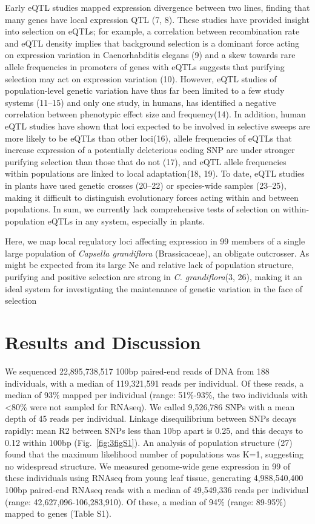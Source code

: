 Early eQTL studies mapped expression divergence between two lines, finding that many genes have local expression QTL (7, 8). These studies have provided insight into selection on eQTLs; for example,  a correlation between recombination rate and eQTL density implies that background selection is a dominant force acting on expression variation in Caenorhabditis elegans (9) and a skew towards rare allele frequencies in promoters of genes with eQTLs suggests that purifying selection may act on expression variation (10). However, eQTL studies of population-level genetic variation have thus far been limited to a few study systems (11–15) and only one study, in humans, has identified a negative correlation between phenotypic effect size and frequency(14). In addition, human eQTL studies have shown that loci expected to be involved in selective sweeps are more likely to be eQTLs than other loci(16), allele frequencies of eQTLs that increase expression of a potentially deleterious coding SNP are under stronger purifying selection than those that do not (17), and eQTL allele frequencies within populations are linked to local adaptation(18, 19). To date, eQTL studies in plants have used genetic crosses (20–22) or species-wide samples (23–25), making it difficult to distinguish evolutionary forces acting within and between populations. In sum, we currently lack comprehensive tests of selection on within-population eQTLs in any system, especially in plants.

Here, we map local regulatory loci affecting expression in 99 members of a single large population of \textit{Capsella grandiflora} (Brassicaceae), an obligate outcrosser. As might be expected from its large Ne and relative lack of population structure, purifying and positive selection are strong in \textit{C. grandiflora}(3, 26), making it an ideal system for investigating the maintenance of genetic variation in the face of selection 

\section{Results and Discussion}
We sequenced 22,895,738,517 100bp paired-end reads of DNA from 188 individuals, with a median of 119,321,591 reads per individual. Of these reads, a median of 93\% mapped per individual (range: 51\%-93\%, the two individuals with \textless 80\% were not sampled for RNAseq). We called 9,526,786 SNPs with a mean depth of 45 reads per individual. Linkage disequilibrium between SNPs decays rapidly: mean R2 between SNPs less than 10bp apart is 0.25, and this decays to 0.12 within 100bp (Fig.~\ref{fig:3figS1}). An analysis of population structure (27) found that the maximum likelihood number of populations was K=1, suggesting no widespread structure. We measured genome-wide gene expression in 99 of these individuals using RNAseq from young leaf tissue, generating 4,988,540,400 100bp paired-end RNAseq reads with a median of 49,549,336 reads per individual (range: 42,627,096-106,283,910). Of these, a median of 94\% (range: 89-95\%) mapped to genes (Table S1). 

